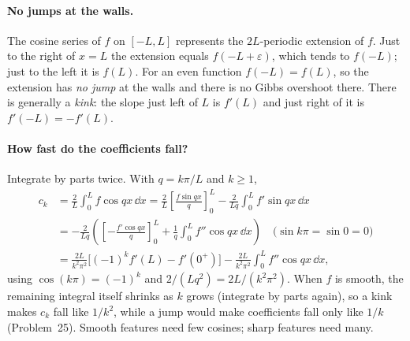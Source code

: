 \paragraph{No jumps at the walls.} The cosine series of $f$ on $[-L,L]$ represents the $2L$-periodic extension of $f$. Just to the right of $x=L$ the extension equals $f(-L+\varepsilon)$, which tends to $f(-L)$; just to the left it is $f(L)$. For an even function $f(-L)=f(L)$, so the extension has \emph{no jump} at the walls and there is no Gibbs overshoot there. There is generally a \emph{kink}: the slope just left of $L$ is $f'(L)$ and just right of it is $f'(-L)=-f'(L)$.

\paragraph{How fast do the coefficients fall?} Integrate by parts twice. With $q=k\pi/L$ and $k\ge1$,
\begin{align}
c_k&=\frac2L\int_0^Lf\cos qx\,\dd x=\frac2L\left[\frac{f\sin qx}{q}\right]_0^L-\frac{2}{Lq}\int_0^Lf'\sin qx\,\dd x\\
&=-\frac2{Lq}\left(\left[-\frac{f'\cos qx}{q}\right]_0^L+\frac1q\int_0^Lf''\cos qx\,\dd x\right)\quad\text{($\sin k\pi=\sin0=0$)}\\
&=\frac{2L}{k^2\pi^2}\Big[(-1)^kf'(L)-f'(0^+)\Big]-\frac{2L}{k^2\pi^2}\int_0^Lf''\cos qx\,\dd x,
\label{eq:fourier-series-decay}
\end{align}
using $\cos(k\pi)=(-1)^k$ and $2/(Lq^2)=2L/(k^2\pi^2)$. When $f$ is smooth, the remaining integral itself shrinks as $k$ grows (integrate by parts again), so a kink makes $c_k$ fall like $1/k^2$, while a jump would make coefficients fall only like $1/k$ (Problem~25). Smooth features need few cosines; sharp features need many.

